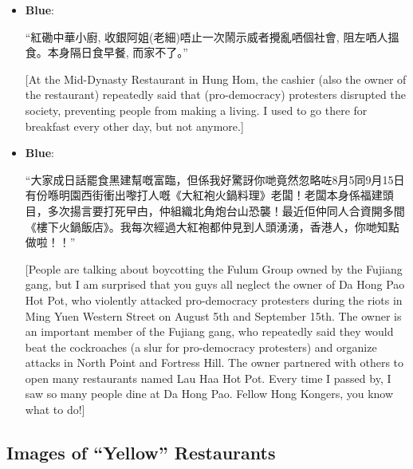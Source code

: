 \documentclass[letterpaper, 12pt]{article}
\begin{document}
\begin{appendices}
\begin{itemize}
    \item \textbf{Blue}: \begin{CJK*}{UTF8}{bkai}``紅磡中華小廚, 收銀阿姐(老細)唔止一次鬧示威者攪亂哂個社會, 阻左哂人搵食。本身隔日食早餐, 而家不了。''\end{CJK*} [At the Mid-Dynasty Restaurant in Hung Hom, the cashier (also the owner of the restaurant) repeatedly said that (pro-democracy) protesters disrupted the society, preventing people from making a living. I used to go there for breakfast every other day, but not anymore.]
    
    \item \textbf{Blue}:
    \begin{CJK*}{UTF8}{bkai}``大家成日話罷食黑建幫嘅富臨，但係我好驚訝你哋竟然忽略咗8月5同9月15日有份喺明園西街衝出嚟打人嘅《大紅袍火鍋料理》老闆！老闆本身係福建頭目，多次揚言要打死曱甴，仲組織北角炮台山恐襲！最近佢仲同人合資開多間《樓下火鍋飯店》。我每次經過大紅袍都仲見到人頭湧湧，香港人，你哋知點做啦！！''\end{CJK*} [People are talking about boycotting the Fulum Group owned by the Fujiang gang, but I am surprised that you guys all neglect the owner of Da Hong Pao Hot Pot, who violently attacked pro-democracy protesters during the riots in Ming Yuen Western Street on August 5th and September 15th. The owner is an important member of the Fujiang gang, who repeatedly said they would beat the cockroaches (a slur for pro-democracy protesters) and organize attacks in North Point and Fortress Hill. The owner partnered with others to open many restaurants named Lau Haa Hot Pot. Every time I passed by, I saw so many people dine at Da Hong Pao. Fellow Hong Kongers, you know what to do!]
\end{itemize}

\subsection{Images of ``Yellow'' Restaurants} \label{appendix:yellow_sticker_slogan}


\end{appendices}
\end{document}
